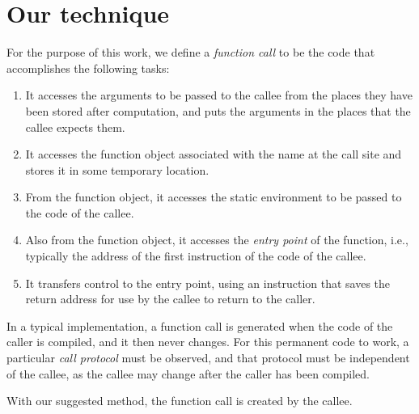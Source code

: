 \section{Our technique}
\label{sec-our-technique}

For the purpose of this work, we define a \emph{function call} to be
the code that accomplishes the following tasks:

\begin{enumerate}
\item It accesses the arguments to be passed to the callee from the
  places they have been stored after computation, and puts the
  arguments in the places that the callee expects them.
\item It accesses the function object associated with the name at the
  call site and stores it in some temporary location.
\item From the function object, it accesses the static environment to
  be passed to the code of the callee.
\item Also from the function object, it accesses the \emph{entry
  point} of the function, i.e., typically the address of the first
  instruction of the code of the callee.
\item It transfers control to the entry point, using an instruction
  that saves the return address for use by the callee to return to the
  caller.
\end{enumerate}

In a typical implementation, a function call is generated when the
code of the caller is compiled, and it then never changes.  For this
permanent code to work, a particular \emph{call protocol} must be
observed, and that protocol must be independent of the callee, as the
callee may change after the caller has been compiled.

With our suggested method, the function call is created by the
callee.
